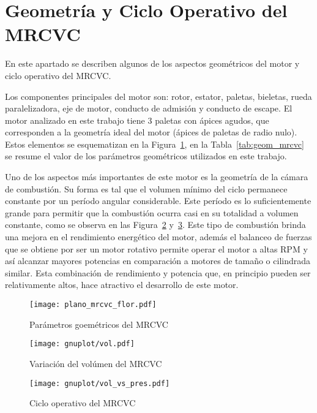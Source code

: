\section{Geometría y Ciclo Operativo del MRCVC}
%
En este apartado se describen algunos de los aspectos geométricos del motor y
ciclo operativo del MRCVC.

Los componentes principales del motor son: rotor, estator, paletas, bieletas,
rueda paralelizadora, eje de motor, conducto de admisión y conducto de escape.
%
El motor analizado en este trabajo tiene 3 paletas con ápices agudos, que
corresponden a la geometría ideal del motor (ápices de paletas de radio nulo).
%
Estos elementos se esquematizan en la Figura~\ref{fig:geom_flor_mrcvc}, en la
Tabla~\ref{tab:geom_mrcvc} se resume el valor de los parámetros geométricos
utilizados en este trabajo.

Uno de los aspectos más importantes de este motor es la geometría de la cámara
de combustión.
%
Su forma es tal que el volumen mínimo del ciclo permanece constante por un
período angular considerable. %
%
Este período es lo suficientemente grande para permitir que la combustión ocurra
casi en su totalidad a volumen constante, como se observa en las
Figura~\ref{fig:mrcvc_vol_cte} y~\ref{fig:PV_mrcvc}.
%
Este tipo de combustión brinda una mejora en el rendimiento energético del motor,
además el balanceo de fuerzas que se obtiene por ser un motor rotativo permite
operar el motor a altas RPM y así alcanzar mayores potencias en comparación a
motores de tamaño o cilindrada similar.
%
Esta combinación de rendimiento y potencia que, en principio pueden ser
relativamente altos, hace atractivo el desarrollo de este motor.
%

\begin{figure}[ht]
  \centering
  \texttt{[image: plano\_mrcvc\_flor.pdf]}
  \caption{Parámetros goemétricos del MRCVC~\parencite{roldan}}\label{fig:geom_flor_mrcvc}
\end{figure}

\begin{figure}[ht]
  \centering
  \texttt{[image: gnuplot/vol.pdf]}
  \caption{Variación del volúmen del MRCVC}\label{fig:mrcvc_vol_cte}
\end{figure}

\begin{figure}[ht]
  \centering
  \texttt{[image: gnuplot/vol\_vs\_pres.pdf]}
  \caption{Ciclo operativo del MRCVC}\label{fig:PV_mrcvc}
\end{figure}


